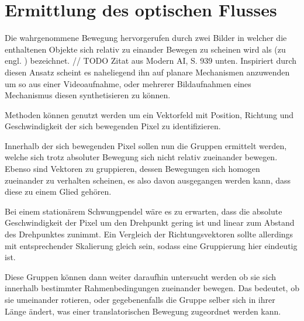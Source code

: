 
\chapter{Ermittlung des optischen Flusses}

Die wahrgenommene Bewegung hervorgerufen durch zwei Bilder in welcher die enthaltenen Objekte sich relativ zu einander Bewegen zu scheinen wird als (zu engl. ) bezeichnet. // TODO Zitat aus Modern AI, S. 939 unten.
Inspiriert durch diesen Ansatz scheint es naheliegend ihn auf planare Mechanismen anzuwenden um so aus einer Videoaufnahme, oder mehrerer Bildaufnahmen eines Mechanismus diesen synthetisieren zu können.


 Methoden können genutzt werden um ein Vektorfeld mit Position, Richtung und Geschwindigkeit der sich bewegenden Pixel zu identifizieren.

Innerhalb der sich bewegenden Pixel sollen nun die Gruppen ermittelt werden, welche sich trotz absoluter Bewegung sich nicht relativ zueinander bewegen.
Ebenso sind Vektoren zu gruppieren, dessen Bewegungen sich homogen zueinander zu verhalten scheinen, es also davon ausgegangen werden kann, dass diese zu einem Glied gehören.

Bei einem stationärem Schwungpendel wäre es zu erwarten, dass die absolute Geschwindigkeit der Pixel um den Drehpunkt gering ist und linear zum Abstand des Drehpunktes zunimmt.
Ein Vergleich der Richtungsvektoren sollte allerdings mit entsprechender Skalierung gleich sein, sodass eine Gruppierung hier eindeutig ist.

Diese Gruppen können dann weiter daraufhin untersucht werden ob sie sich innerhalb bestimmter Rahmenbedingungen zueinander bewegen.
Das bedeutet, ob sie umeinander rotieren, oder gegebenenfalls die Gruppe selber sich in ihrer Länge ändert, was einer translatorischen Bewegung zugeordnet werden kann.

